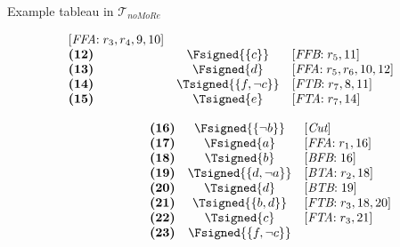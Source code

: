 \begin{frame}{Example tableau in $\mathcal{T}_{\textit{noMoRe}}$}
\begin{center}
\begin{minipage}[t]{16cm}
\begin{minipage}[t]{4.5cm}
\[\begin{array}{lcl}
  [\textit{FFA}{:}\;r_3,r_4, \text{9}, \text{10}]  \\
\textbf{(12)}                                      &
  \Fsigned{\{c\}}                                  &
  [\textit{FFB}{:}\;r_5, \text{11}]                \\
\textbf{(13)}                                      &
  \Fsigned{d}                                      &
  [\textit{FFA}{:}\;r_5,r_6, \text{10}, \text{12}] \\
\textbf{(14)}                                      &
  \Tsigned{\{f,\neg c\}}                   &
  [\textit{FTB}{:}\;r_7, \text{8}, \text{11}]      \\
\textbf{(15)}                                      &
  \Tsigned{e}                                      &
  [\textit{FTA}{:}\;r_7, \text{14}]
\end{array}
\]
\end{minipage}
\begin{minipage}[t]{6cm}
\[
\hspace{2.2cm}
\begin{array}{lcl}
\textbf{(16)}                                      &
  \Fsigned{\{\neg b\}}                     &
  [\textit{Cut}]                                   \\
\textbf{(17)}                                      &
  \Fsigned{a}                                      &
  [\textit{FFA}{:}\; r_1, \text{16}]               \\
\textbf{(18)}                                      &
  \Tsigned{b}                                      &
  [\textit{BFB}{:}\; \text{16}]                    \\
\textbf{(19)}                                      &
  \Tsigned{\{d,\neg a\}}                   &
  [\textit{BTA}{:}\;r_2, \text{18}]                \\
\textbf{(20)}                                      &
  \Tsigned{d}                                      &
  [\textit{BTB}{:}\;\text{19}]                     \\
\textbf{(21)}                                      &
  \Tsigned{\{b,d\}}                                &
  [\textit{FTB}{:}\;r_3, \text{18}, \text{20}]     \\
\textbf{(22)}                                      &
  \Tsigned{c}                                      &
  [\textit{FTA}{:}\;r_3, \text{21}]                \\
\textbf{(23)}                                      &
  \Fsigned{\{f,\neg c\}}                   &

\end{array}\]
\end{minipage}
\end{minipage}
\end{center}
\end{frame}
